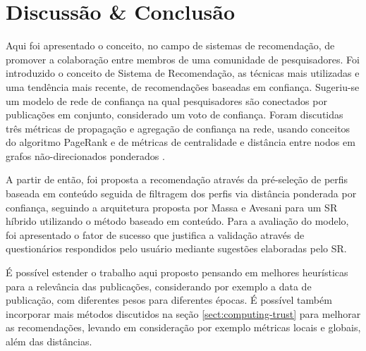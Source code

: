\documentclass[12pt]{article}
\begin{document}
\section{Discussão \& Conclusão}

Aqui foi apresentado o conceito, no campo de sistemas de recomendação, de promover a colaboração entre membros de uma comunidade 
de pesquisadores. Foi introduzido o conceito de Sistema de Recomendação, as técnicas mais utilizadas e uma tendência mais recente, 
de recomendações baseadas em confiança. Sugeriu-se um modelo de rede de confiança na qual pesquisadores são conectados por  
publicações em conjunto, considerado um voto de confiança. Foram discutidas três métricas de propagação e agregação de confiança 
na rede, usando conceitos do algoritmo PageRank \cite{page1999pagerank} e de métricas de centralidade e distância entre nodos em grafos 
não-direcionados ponderados \cite{opsahl2010node}.

A partir de então, foi proposta a recomendação através da pré-seleção de perfis baseada em conteúdo seguida de filtragem dos perfis 
via distância ponderada por confiança, seguindo a arquitetura proposta por Massa e Avesani \cite{massa2004trust} para um SR híbrido 
utilizando o método baseado em conteúdo. Para a avaliação do modelo, foi apresentado o fator de sucesso que justifica a validação 
através de questionários respondidos pelo usuário mediante sugestões elaboradas pelo SR.

É possível estender o trabalho aqui proposto pensando em melhores heurísticas para a relevância das publicações, considerando por 
exemplo a data de publicação, com diferentes pesos para diferentes épocas. É possível também incorporar mais métodos discutidos 
na seção \ref{sect:computing-trust} para melhorar as recomendações, levando em consideração por exemplo métricas locais e globais, 
além das distâncias.



\end{document}
